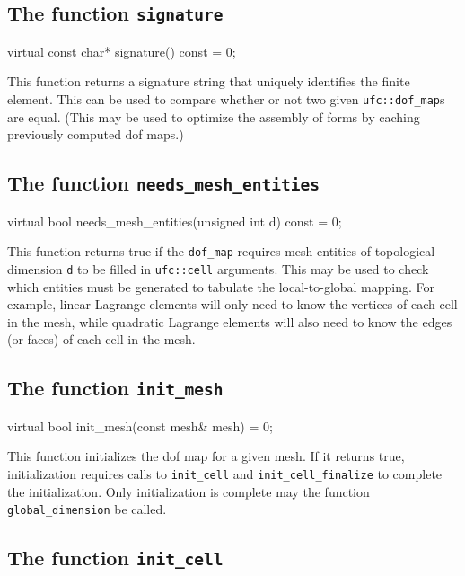 \subsection{The function \texttt{signature}}

\begin{code}
virtual const char* signature() const = 0;
\end{code}

This function returns a signature string that uniquely identifies the
finite element. This can be used to compare whether or not two given
\texttt{ufc::dof\_map}s are equal. (This may be used to optimize the
assembly of forms by caching previously computed dof maps.)

\subsection{The function \texttt{needs\_mesh\_entities}}

\begin{code}
virtual bool needs_mesh_entities(unsigned int d) const = 0;
\end{code}

This function returns true if the \texttt{dof\_map} requires mesh
entities of topological dimension \texttt{d} to be filled in
\texttt{ufc::cell} arguments. This may be used to check which entities
must be generated to tabulate the local-to-global mapping. For
example, linear Lagrange elements will only need to know the vertices
of each cell in the mesh, while quadratic Lagrange elements will also
need to know the edges (or faces) of each cell in the mesh.

\subsection{The function \texttt{init\_mesh}}

\begin{code}
virtual bool init_mesh(const mesh& mesh) = 0;
\end{code}

This function initializes the dof map for a given mesh. If it returns
true, initialization requires calls to \texttt{init\_cell} and
\texttt{init\_cell\_finalize} to complete the initialization. Only
initialization is complete may the function \texttt{global\_dimension}
be called.

\subsection{The function \texttt{init\_cell}}

